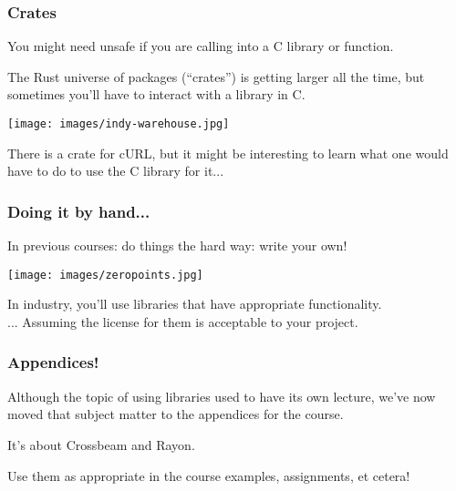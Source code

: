 \begin{frame}
\frametitle{Crates}

You might need unsafe if you are calling into a C library or function.

The Rust universe of packages (``crates'') is getting larger all the time, but sometimes you'll have to interact with a library in C.

\begin{center}
	\texttt{[image: images/indy-warehouse.jpg]}
\end{center}

There is a crate for cURL, but it might be interesting to learn what one would have to do to use the C library for it...

\end{frame}


\begin{frame}
\frametitle{Doing it by hand...}

In previous courses: do things the hard way: write your own!

\begin{center}
	\texttt{[image: images/zeropoints.jpg]}
\end{center}

In industry, you'll use libraries that have appropriate functionality.\\
\quad ... Assuming the license for them is acceptable to your project.

\end{frame}

\begin{frame}
\frametitle{Appendices!}

Although the topic of using libraries used to have its own lecture, we've now moved that subject matter to the appendices for the course.

It's about Crossbeam and Rayon.

Use them as appropriate in the course examples, assignments, et cetera!

\end{frame}



